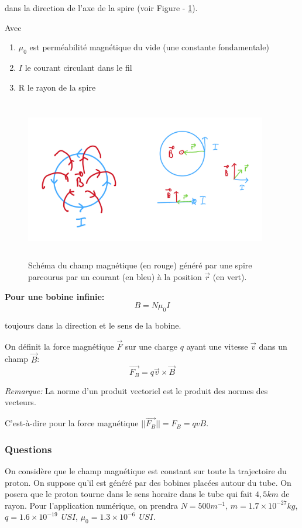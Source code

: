 \documentclass[14pt]{article}
\begin{document}
dans la direction de l'axe de la spire (voir Figure - \ref{fig:spire}).

Avec \begin{enumerate}
    \item $\mu_0$ est perméabilité magnétique du vide (une constante fondamentale)
    \item $I$ le courant circulant dans le fil
    \item R le rayon de la spire
\end{enumerate}

\begin{figure}[ht]
\includegraphics[width=300pt,height=200pt]{spire.png}
\centering
\caption{Schéma du champ magnétique (en rouge) généré par une spire parcourus par un courant (en bleu) à la position $\vec{r}$ (en vert).}
\label{fig:spire}
\end{figure}

\textbf{Pour une bobine infinie:}
\begin{equation} \label{eq:1.2.5}
    B = N \mu_0 I
    \tag{1.2.5}
\end{equation}

toujours dans la direction et le sens de la bobine.

On définit la force magnétique $\vec{F}$ sur une charge $q$ ayant une vitesse $\vec{v}$ dans un champ $\vec{B}$:
\begin{equation} \label{eq:1.2.6}
    \vec{F_B} = q \vec{v} \times \vec{B}
    \tag{1.2.6}
\end{equation}

\textit{Remarque:} La norme d'un produit vectoriel est le produit des normes des vecteurs.

C'est-à-dire pour la force magnétique $||\vec{F_B}|| = F_B = q v B$.



\subsubsection{Questions}\label{q:champB}
On considère que le champ magnétique est constant sur toute la trajectoire du proton. On suppose qu'il est généré par des bobines placées autour du tube.
On posera que le proton tourne dans le sens horaire dans le tube qui fait $4,5 km$ de rayon.
Pour l'application numérique, on prendra $N = 500 m^{-1}$, $m = 1.7 \times 10^{-27} kg$, $q = 1.6 \times 10^{-19} \ \ USI$, $\mu_0 = 1.3 \times 10^{-6} \ \ USI$.
\end{document}
